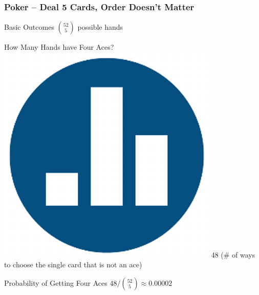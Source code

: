 \documentclass[handout]{beamer}
\begin{document}
\begin{frame}

\frametitle{Poker -- Deal 5 Cards, Order Doesn't Matter}

\begin{block}{Basic Outcomes}
\vspace{0.3em} 
$\displaystyle{52 \choose 5}$ possible hands
\end{block}
\begin{block}{How Many Hands have Four Aces? \hfill \includegraphics[scale = 0.05]{./images/clicker} } \pause
\alert{48 (\# of ways to choose the single card that is not an ace)}
\end{block}

\begin{block}{Probability of Getting Four Aces}
\vspace{0.3em} 
$48/\displaystyle{52 \choose 5} \approx 0.00002$
\end{block}


\end{frame}
\end{document}
